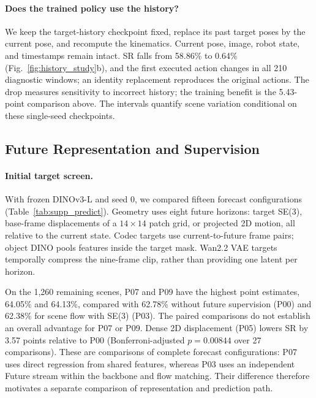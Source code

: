 \paragraph{Does the trained policy use the history?}
We keep the target-history checkpoint fixed, replace its past target poses by the
current pose, and recompute the kinematics. Current pose, image, robot state, and
timestamps remain intact. SR falls from 58.86\% to 0.64\%
(Fig.~\ref{fig:history_study}b), and the first executed action changes in all
210 diagnostic windows; an identity replacement reproduces the original actions.
The drop measures sensitivity to incorrect history; the training benefit is the
5.43-point comparison above. The intervals quantify scene variation conditional
on these single-seed checkpoints.

\subsection{Future Representation and Supervision}
\label{app:design_predict}


\paragraph{Initial target screen.}
With frozen DINOv3-L and seed 0, we compared fifteen forecast configurations
(Table~\ref{tab:supp_predict}). Geometry uses eight future horizons: target SE(3),
base-frame displacements of a $14\times14$ patch grid, or projected 2D motion,
all relative to the current state. Codec targets use current-to-future frame pairs;
object DINO pools features inside the target mask. Wan2.2 VAE targets temporally
compress the nine-frame clip, rather than providing one latent per horizon.

On the 1{,}260 remaining scenes, P07 and P09 have the highest point estimates,
64.05\% and 64.13\%, compared with 62.78\% without future supervision (P00) and
62.38\% for scene flow with SE(3) (P03). The paired comparisons do not establish an
overall advantage for P07 or P09. Dense 2D displacement (P05) lowers SR by 3.57
points relative to P00 (Bonferroni-adjusted $p=0.00844$ over 27 comparisons).
These are comparisons of complete forecast configurations: P07 uses direct
regression from shared features, whereas P03 uses an independent Future stream
within the backbone and flow matching. Their difference therefore motivates a
separate comparison of representation and prediction path.


